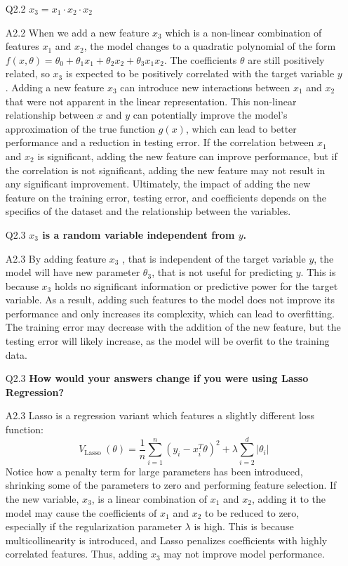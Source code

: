 \documentclass[tikz,14pt,fleqn]{article}
\begin{document}
\begin{itemize}
\item[Q2.2] \textbf{$x_3 = x_1 \cdot x_2 \cdot x_2$}
\item[A2.2] When we add a new feature $x_3$ which is a non-linear combination of features $x_1$ and $x_2$, the model changes to a quadratic polynomial of the form $f(x, \theta) = \theta_0 + \theta_1 x_1 + \theta_2 x_2 + \theta_3 x_1 x_2$. The coefficients $\theta$ are still positively related, so $x_3$ is expected to be positively correlated with the target variable $y$.
Adding a new feature $x_3$ can introduce new interactions between $x_1$ and $x_2$ that were not apparent in the linear representation. This non-linear relationship between $x$ and $y$ can potentially improve the model's approximation of the true function $g(x)$, which can lead to better performance and a reduction in testing error.
If the correlation between $x_1$ and $x_2$ is significant, adding the new feature can improve performance, but if the correlation is not significant, adding the new feature may not result in any significant improvement. Ultimately, the impact of adding the new feature on the training error, testing error, and coefficients depends on the specifics of the dataset and the relationship between the variables.

\item[Q2.3] \textbf{$x_3$ is a random variable independent from $y$.}
\item[A2.3] By adding feature $x_3$ , that is independent of the target variable $y$, the model will have new parameter $\theta_3$, that is not useful for predicting $y$. This is because $x_3$ holds no significant information or predictive power for the target variable. As a result, adding such features to the model does not improve its performance and only increases its complexity, which can lead to overfitting. The training error may decrease with the addition of the new feature, but the testing error will likely increase, as the model will be overfit to the training data.

\item[Q2.3] \textbf{How would your answers change if you were using Lasso Regression?}
\item[A2.3] Lasso is a regression variant which features a slightly different loss function:
$$
V_{\text {Lasso }}(\theta)=\frac{1}{n} \sum_{i=1}^n\left(y_i-x_i^T \theta\right)^2+\lambda \sum_{i=2}^d\left|\theta_i\right|
$$
Notice how a penalty term for large parameters has been introduced, shrinking some of the parameters to zero and performing feature selection.
If the new variable, $x_3$, is a linear combination of $x_1$ and $x_2$, adding it to the model may cause the coefficients of $x_1$ and $x_2$ to be reduced to zero, especially if the regularization parameter $\lambda$ is high. This is because multicollinearity is introduced, and Lasso penalizes coefficients with highly correlated features. Thus, adding $x_3$ may not improve model performance.


\end{itemize}
\end{document}
